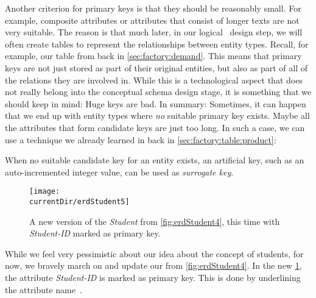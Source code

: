 Another criterion for primary keys is that they should be reasonably small.
For example, composite attributes or attributes that consist of longer texts are not very suitable.
The reason is that much later, in our logical \db\ design step, we will often create tables to represent the relationships between entity types.
Recall, for example, our  table from back in \cref{sec:factory:demand}.
This means that primary keys are not just stored as part of their original entities, but also as part of all of the relations they are involved in.
While this is a technological aspect that does not really belong into the conceptual schema design stage, it is something that we should keep in mind:
Huge keys are bad.
In summary:%
%
%
%
Sometimes, it can happen that we end up with entity types where \emph{no} suitable primary key exists.
Maybe all the attributes that form candidate keys are just too long.
In such a case, we can use a technique we already learned in back in \cref{sec:factory:table:product}:%
%
\begin{definition}%
\label{def:surrogateKey}%
When no suitable candidate key for an entity exists, an artificial key, such as an auto-incremented integer value, can be used as \emph{surrogate key}.%
\end{definition}%
\begin{figure}%
%
\centering%
\texttt{[image: \\currentDir/erdStudent5]}%
\caption{A new version of the \emph{Student}  from \cref{fig:erdStudent4}, this time with \emph{Student-ID} marked as primary key.}%
\label{fig:erdStudent5}%
\end{figure}%
%
While we feel very pessimistic about our idea about the concept of students, for now, we bravely march on and update our  from \cref{fig:erdStudent4}.
In the new \cref{fig:erdStudent5}, the attribute \emph{Student-ID} is marked as primary key.
This is done by underlining the attribute name~\cite{G2011EW2ITDS:CMUTERM}.%
%
\FloatBarrier%
\endhsection%
%
